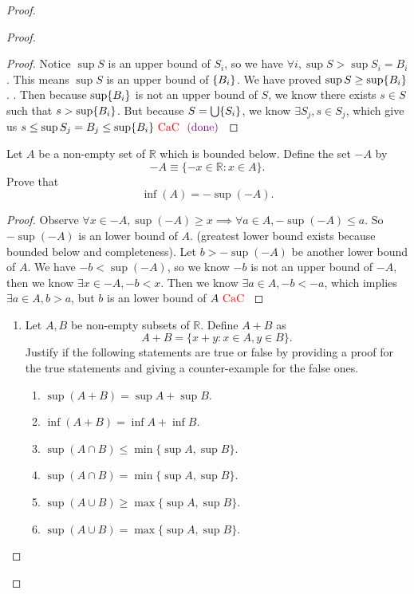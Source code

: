 \documentclass{report}
\begin{document}
\begin{proof}
\begin{proof}
\begin{proof}
  Notice $\sup S$ is an upper bound of $S_i$, so we have $\forall i, \sup S>\sup S_i=B_i$. This means $\sup S$ is an upper bound of $\{ B_i \}$. We have proved $\sup S\geq \sup \{ B_i \}$. . Then because $\sup \{ B_i \}$ is not an upper bound of $S$, we know there exists  $s \in S$ such that $s>\sup \{ B_i \}$. But because $S=\bigcup \{ S_i \}$, we know $\exists S_j,s \in S_j$, which give us $s\leq \sup S_j=B_j\leq \sup \{ B_i \}\text{ \textcolor{red}{CaC} }\textcolor{violet}{\text{ (done) }}$
\end{proof}
\begin{question}{}{}
Let \( A \) be a non-empty set of \( \mathbb{R} \) which is bounded below. Define the set \( -A \) by 
\[ -A \equiv \{-x \in \mathbb{R} : x \in A\}. \]
Prove that
\[ \inf(A) = -\sup(-A). \]
\end{question}
\begin{proof}
Observe $\forall x\in -A, \sup (-A)\geq  x\implies \forall a \in A, -\sup (-A)\leq  a$. So $-\sup (-A)$ is an lower bound of $A$.  (greatest lower bound exists because bounded below and completeness). Let $b>-\sup (-A)$ be another lower bound of $A$. We have $-b<\sup (-A)$, so we know $-b$ is not an upper bound of $-A$, then we know  $\exists x \in -A, -b<x$. Then we know $\exists a \in A, -b<-a$, which implies $\exists a \in A, b>a$, but $b$ is an lower bound of $A\text{ \textcolor{red}{CaC} }$
\end{proof}
\begin{question}{}{}
\begin{enumerate}
    \item Let \( A, B \) be non-empty subsets of \( \mathbb{R} \). Define \( A+B \) as 
    \[ A+B = \{ x+y : x \in A, y \in B \}. \]
    Justify if the following statements are true or false by providing a proof for the true statements and giving a counter-example for the false ones.
    \begin{enumerate}
        \item \( \sup(A+B) = \sup A + \sup B \).
        \item \( \inf(A+B) = \inf A + \inf B \).
        \item \( \sup(A \cap B) \leq \min\{\sup A, \sup B\} \).
        \item \( \sup(A \cap B) = \min\{\sup A, \sup B\} \).
        \item \( \sup(A \cup B) \geq \max\{\sup A, \sup B\} \).
        \item \( \sup(A \cup B) = \max\{\sup A, \sup B\} \).
    \end{enumerate}

\end{enumerate}
\end{question}
\end{proof}
\end{proof}
\end{document}
